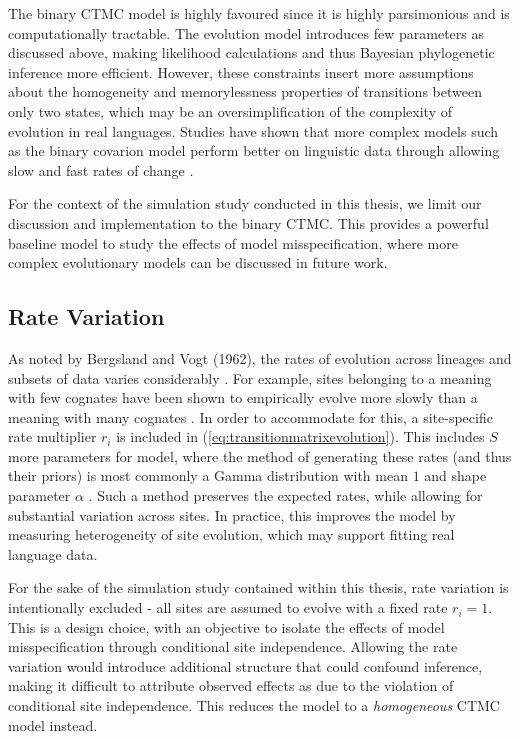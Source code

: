The binary CTMC model is highly favoured since it is highly parsimonious and is computationally tractable. The evolution model introduces few parameters as discussed above, making likelihood calculations and thus Bayesian phylogenetic inference more efficient. However, these constraints insert more assumptions about the homogeneity and memorylessness properties of transitions between only two states, which may be an oversimplification of the complexity of evolution in real languages. Studies have shown that more complex models such as the binary covarion model \cite{Tuffley1998} perform better on linguistic data through allowing slow and fast rates of change \cite{hoffmann_bayesian_2021}. 

For the context of the simulation study conducted in this thesis, we limit our discussion and implementation to the binary CTMC. This provides a powerful baseline model to study the effects of model misspecification, where more complex evolutionary models can be discussed in future work.

\subsection{Rate Variation}
\label{sec:ratevariation}
As noted by Bergsland and Vogt (1962), the rates of evolution across lineages and subsets of data varies considerably \cite{Bergsland1962}. For example, sites belonging to a meaning with few cognates have been shown to empirically evolve more slowly than a meaning with many cognates \cite{Pagel2006}. In order to accommodate for this, a site-specific rate multiplier $r_i$ is included in (\ref{eq:transitionmatrixevolution}). This includes $S$ more parameters for model, where the method of generating these rates (and thus their priors) is most commonly a Gamma distribution with mean $1$ and shape parameter $\alpha$ \cite{hoffmann_bayesian_2021}. Such a method preserves the expected rates, while allowing for substantial variation across sites. In practice, this improves the model by measuring heterogeneity of site evolution, which may support fitting real language data. 

For the sake of the simulation study contained within this thesis, rate variation is intentionally excluded - all sites are assumed to evolve with a fixed rate $r_i = 1$. This is a design choice, with an objective to isolate the effects of model misspecification through conditional site independence. Allowing the rate variation would introduce additional structure that could confound inference, making it difficult to attribute observed effects as due to the violation of conditional site independence. This reduces the model to a \textit{homogeneous} CTMC model instead.

